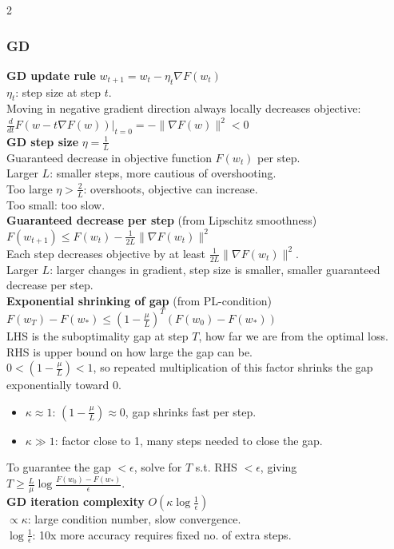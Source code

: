 \documentclass[10pt]{article}
\begin{document}
\begin{multicols*}{2}
\subsubsection*{GD}
\textbf{GD update rule} $w_{t+1} = w_t - \eta_t\nabla F(w_t)$\\
$\eta_t$: step size at step $t$.\\
Moving in negative gradient direction always locally decreases objective:\\
$\frac{d}{dt}F(w - t\nabla F(w))\bigg|_{t=0} = -\|\nabla F(w)\|^2 < 0$\\
\textbf{GD step size} $\eta = \frac{1}{L}$\\
Guaranteed decrease in objective function $F(w_t)$ per step.\\
Larger $L$: smaller steps, more cautious of overshooting.\\
Too large $\eta > \frac{2}{L}$: overshoots, objective can increase.\\
Too small: too slow.\\
\textbf{Guaranteed decrease per step} (from Lipschitz smoothness)\\
$F(w_{t+1}) \leq F(w_t) - \frac{1}{2L}\|\nabla F(w_t)\|^2$\\
Each step decreases objective by at least $\frac{1}{2L}\|\nabla F(w_t)\|^2$.\\
Larger $L$: larger changes in gradient, step size is smaller, smaller guaranteed decrease per step.\\
\textbf{Exponential shrinking of gap} (from PL-condition)\\
$F(w_T) - F(w_*) \leq \left(1 - \frac{\mu}{L}\right)^T(F(w_0) - F(w_*))$\\
LHS is the suboptimality gap at step $T$, how far we are from the optimal loss. RHS is upper bound on how large the gap can be.\\
$0 < (1-\frac{\mu}{L}) < 1$, so repeated multiplication of this factor shrinks the gap exponentially toward 0.\\
\begin{itemize}
    \item $\kappa \approx 1$: $(1-\frac{\mu}{L}) \approx 0$, gap shrinks fast per step.
    \item $\kappa \gg 1$: factor close to 1, many steps needed to close the gap.
\end{itemize}
To guarantee the gap $< \epsilon$, solve for $T$ s.t. RHS $<\epsilon$, giving $T \geq \frac{L}{\mu}\log\frac{F(w_0)-F(w_*)}{\epsilon}$.\\
\textbf{GD iteration complexity}
$O\left(\kappa\log\frac{1}{\epsilon}\right)$\\
$\propto\kappa$: large condition number, slow convergence.\\
$\log \frac{1}{\epsilon}$: 10x more accuracy requires fixed no. of extra steps.\\[1\baselineskip]


\end{multicols*}
\end{document}
